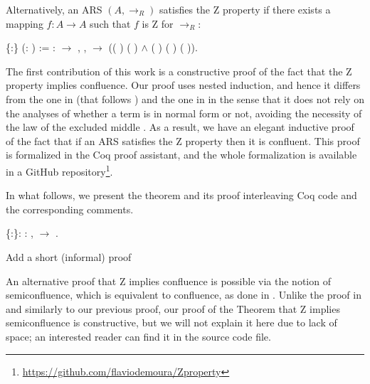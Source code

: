 \documentclass[a4paper]{article}
\newcommand{\flavio}[1]{{\color{red}#1}}
\begin{document}
Alternatively, an ARS $(A,\to_R)$ satisfies the Z property if there
exists a mapping $f:A \to A$ such that $f$ is Z for $\to_R$:

\begin{coqdoccode}
  \coqdocemptyline \coqdocnoindent {}
   \{:\}
  (:  ) :=
  \coqdoctac{\ensuremath{\exists}} :
  \ensuremath{\rightarrow} ,
  \coqdockw{\ensuremath{\forall}}  ,
     \ensuremath{\rightarrow}
  (( )  (
  ) \ensuremath{\land} (
  ) ( ) (
  )).\coqdoceol \coqdocemptyline
\end{coqdoccode}

The first contribution of this work is a constructive proof of the
fact that the Z property implies confluence. Our proof uses nested
induction, and hence it differs from the one in \cite{kes09} (that
follows \cite{dehornoy2008z}) and the one in \cite{zproperty} in the
sense that it does not rely on the analyses of whether a term is in
normal form or not, avoiding the necessity of the law of the excluded
middle . As a result, we have an elegant inductive proof of the fact
that if an ARS satisfies the Z property then it is confluent. This
proof is formalized in the Coq proof assistant, and the whole
formalization is available in a GitHub
repository\footnote{\url{https://github.com/flaviodemoura/Zproperty}}.

In what follows, we present the theorem and its proof interleaving Coq
code and the corresponding comments.
\begin{coqdoccode}
  \coqdocemptyline \coqdocnoindent {}
  \{:\}: \coqdockw{\ensuremath{\forall}}
  :  , 
   \ensuremath{\rightarrow} 
  .
\end{coqdoccode}

\flavio{Add a short (informal) proof}
  
An alternative proof that Z implies confluence is possible via the
notion of semiconfluence, which is equivalent to confluence, as done
in \cite{zproperty}. Unlike the proof in \cite{zproperty} and
similarly to our previous proof, our proof of the Theorem that Z
implies semiconfluence is constructive, but we will not explain it
here due to lack of space; an interested reader can find it in the
source code file.
\end{document}
